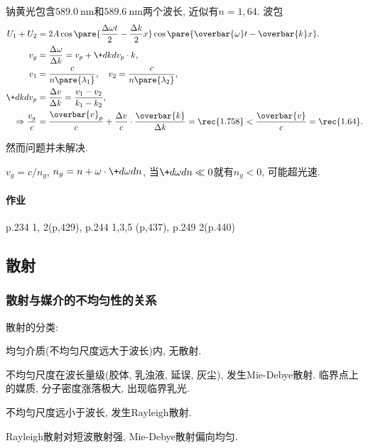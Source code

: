 \documentclass{ctexart}
\begin{document}
\begin{ex}
    钠黄光包含$\SI{589.0}{\nano\meter}$和$\SI{589.6}{\nano\meter}$两个波长, 近似有$n = 1,64$. 波包
    \begin{align*}
        {U}_1 + {U}_2 &= 2A \cos\pare{\frac{\Delta\omega t}{2} - \frac{\Delta k}{2}x}\cos\pare{\overbar{\omega}t - \overbar{k}x}. \\
        v_g &= \frac{\Delta\omega}{\Delta k} = v_p + \+dkd{v_p}\cdot k, \\
        v_1 &= \frac{c}{n\pare{\lambda_1}},\quad v_2 = \frac{c}{n\pare{\lambda_2}}, \\
        \+dkd{v_p} &= \frac{\Delta v}{\Delta k} = \frac{v_1 - v_2}{k_1 - k_2}, \\
        \Rightarrow \frac{v_g}{c} &= \frac{\overbar{v}_p}{c} + \frac{\Delta v}{c}\cdot \frac{\overbar{k}}{\Delta k} = \rec{1.758} < \frac{\overbar{v}}{c} = \rec{1.64}.
    \end{align*}
\end{ex}
然而问题并未解决.
\begin{ex}
    $v_g = c/n_g$, $\displaystyle n_g = n + \omega\cdot\+d\omega dn$, 当$\displaystyle \+d\omega dn \ll 0$就有$n_g < 0$, 可能超光速.
\end{ex}

\paragraph{作业} %
\label{par:作业}

p.234 1, 2(p,429), p.244 1,3,5 (p,437), p.249 2(p.440)



\subsection{散射} %
\label{sub:散射}

\subsubsection{散射与媒介的不均匀性的关系} %
\label{ssub:散射与媒介的不均匀性的关系}

散射的分类:
\begin{cenum}
    \item 均匀介质(不均匀尺度远大于波长)内, 无散射.
    \item 不均匀尺度在波长量级(胶体, 乳浊液, 延误, 灰尘), 发生Mie-Debye散射. 临界点上的媒质, 分子密度涨落极大, 出现临界乳光.
    \item 不均匀尺度远小于波长, 发生Rayleigh散射.
\end{cenum}
Rayleigh散射对短波散射强, Mie-Debye散射偏向均匀.
\end{document}

